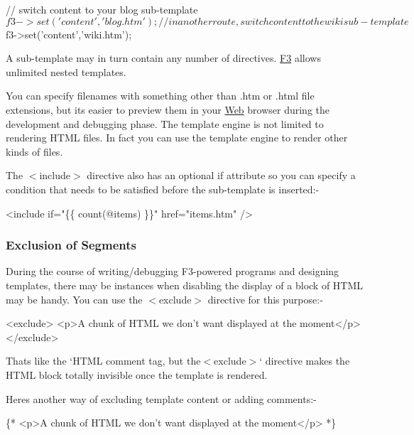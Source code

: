 \begin{DoxyCode}
// switch content to your blog sub-template
$f3->set('content','blog.htm');
// in another route, switch content to the wiki sub-template
$f3->set('content','wiki.htm');
\end{DoxyCode}


A sub-\/template may in turn contain any number of  directives. \hyperlink{class_f3}{F3} allows unlimited nested templates.

You can specify filenames with something other than .htm or .html file extensions, but it\textquotesingle{}s easier to preview them in your \hyperlink{class_web}{Web} browser during the development and debugging phase. The template engine is not limited to rendering H\+T\+ML files. In fact you can use the template engine to render other kinds of files.

The {\ttfamily $<$include$>$} directive also has an optional {\ttfamily if} attribute so you can specify a condition that needs to be satisfied before the sub-\/template is inserted\+:-\/


\begin{DoxyCode}
<include if="\{\{ count(@items) \}\}" href="items.htm" />
\end{DoxyCode}


\subsubsection*{Exclusion of Segments}

During the course of writing/debugging F3-\/powered programs and designing templates, there may be instances when disabling the display of a block of H\+T\+ML may be handy. You can use the {\ttfamily $<$exclude$>$} directive for this purpose\+:-\/


\begin{DoxyCode}
<exclude>
    <p>A chunk of HTML we don't want displayed at the moment</p>
</exclude>
\end{DoxyCode}


That\textquotesingle{}s like the `{\ttfamily H\+T\+ML comment tag, but the}$<$exclude$>$` directive makes the H\+T\+ML block totally invisible once the template is rendered.

Here\textquotesingle{}s another way of excluding template content or adding comments\+:-\/


\begin{DoxyCode}
\{* <p>A chunk of HTML we don't want displayed at the moment</p> *\}
\end{DoxyCode}


